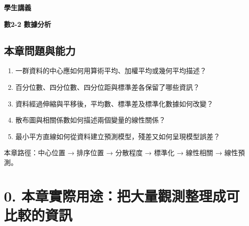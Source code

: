 \documentclass[11pt,a4paper]{article}
\providecommand{\tightlist}{%
  \setlength{\itemsep}{0pt}\setlength{\parskip}{0pt}}
\begin{document}
\begin{tcolorbox}[
  enhanced,colback=white,colframe=HandoutBlue,boxrule=1.1pt,arc=2mm,
  borderline west={3pt}{0pt}{HandoutBlue},left=5mm,right=4mm,top=4mm,bottom=4mm
]
{\sffamily\small\bfseries\color{HandoutBlue}學生講義}\par
{\sffamily\bfseries\LARGE\color{HandoutInk}數2-2 數據分析}\par
\vspace{0.35em}{\large 用中心、分散、標準化與線性模型，從資料回答可比較的問題}\par
{}\par
{}\par
\end{tcolorbox}


\begin{HandoutLearningMap}

\subsection{本章問題與能力}\label{ux672cux7ae0ux554fux984cux8207ux80fdux529b}

\begin{enumerate}
\def\labelenumi{\arabic{enumi}.}
\tightlist
\item
  一群資料的中心應如何用算術平均、加權平均或幾何平均描述？
\item
  百分位數、四分位數、四分位距與標準差各保留了哪些資訊？
\item
  資料經過伸縮與平移後，平均數、標準差及標準化數據如何改變？
\item
  散布圖與相關係數如何描述兩個變量的線性關係？
\item
  最小平方直線如何從資料建立預測模型，殘差又如何呈現模型誤差？
\end{enumerate}

本章路徑：中心位置 → 排序位置 → 分散程度 → 標準化 → 線性相關 → 線性預測。

\end{HandoutLearningMap}

\section{0. 本章實際用途：把大量觀測整理成可比較的資訊}\label{ux672cux7ae0ux5be6ux969bux7528ux9014ux628aux5927ux91cfux89c0ux6e2cux6574ux7406ux6210ux53efux6bd4ux8f03ux7684ux8cc7ux8a0a}
\end{document}
